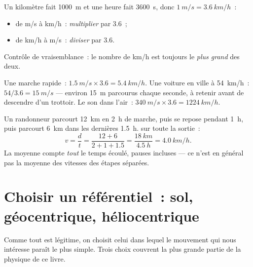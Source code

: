 \begin{method}\label{met:g10:relative-motion:convert}
Un kilomètre fait \qty{1000}{m} et une heure fait \qty{3600}{s}, donc
$\qty{1}{m/s} = \qty{3.6}{km/h}$~:
\begin{itemize}
  \item de \unit{m/s} à \unit{km/h}~: \emph{multiplier} par $3.6$~;
  \item de \unit{km/h} à \unit{m/s}~: \emph{diviser} par $3.6$.
\end{itemize}
Contrôle de vraisemblance~: le nombre de \unit{km/h} est toujours le
\emph{plus grand} des deux.
\end{method}

\begin{example}\label{ex:g10:relative-motion:convert}
Une marche rapide~: $\qty{1.5}{m/s} \times 3.6 = \qty{5.4}{km/h}$. Une
voiture en ville à \qty{54}{km/h}~: $54 / 3.6 = \qty{15}{m/s}$ ---
environ \qty{15}{m} parcourus chaque seconde, à retenir avant de
descendre d'un trottoir. Le son dans l'air~:
$\qty{340}{m/s} \times 3.6 = \qty{1224}{km/h}$.
\end{example}

\begin{example}\label{ex:g10:relative-motion:hike}
Un randonneur parcourt \qty{12}{km} en \qty{2}{h} de marche, puis
se repose pendant \qty{1}{h}, puis parcourt \qty{6}{km} dans les
dernières \qty{1.5}{h}.  sur toute la sortie~:
\[
v = \frac{d}{t} = \frac{12 + 6}{2 + 1 + 1.5}
= \frac{\qty{18}{km}}{\qty{4.5}{h}} = \qty{4.0}{km/h}.
\]
La moyenne compte \emph{tout} le temps écoulé, pauses incluses --- ce
n'est en général pas la moyenne des vitesses des étapes séparées.
\end{example}

\section{Choisir un référentiel~: sol, géocentrique, héliocentrique}

Comme tout  est légitime, on choisit celui dans lequel le
mouvement qui nous intéresse paraît le plus simple. Trois choix
couvrent la plus grande partie de la physique de ce livre.


